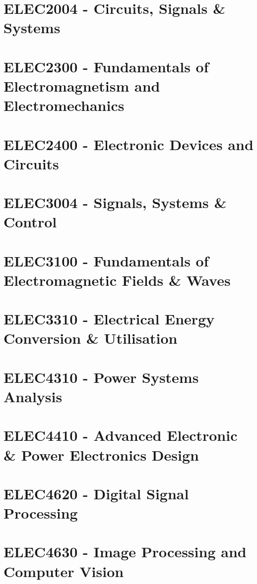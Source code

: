 \documentclass[a4paper,12pt]{report}
\begin{document}
\hypertarget{ELEC2004}{\section{ELEC2004 - Circuits, Signals \& Systems}}

\hypertarget{ELEC2300}{\section{ELEC2300 - Fundamentals of Electromagnetism and Electromechanics}}

\hypertarget{ELEC2400}{\section{ELEC2400 - Electronic Devices and Circuits}}

\hypertarget{ELEC3004}{\section{ELEC3004 - Signals, Systems \& Control}}

\hypertarget{ELEC3100}{\section{ELEC3100 - Fundamentals of Electromagnetic Fields \& Waves}}

\hypertarget{ELEC3310}{\section{ELEC3310 - Electrical Energy Conversion \& Utilisation}}

\hypertarget{ELEC4310}{\section{ELEC4310 - Power Systems Analysis}}

\hypertarget{ELEC4410}{\section{ELEC4410 - Advanced Electronic \& Power Electronics Design}}

\hypertarget{ELEC4620}{\section{ELEC4620 - Digital Signal Processing}}

\hypertarget{ELEC4630}{\section{ELEC4630 - Image Processing and Computer Vision}}
\end{document}
